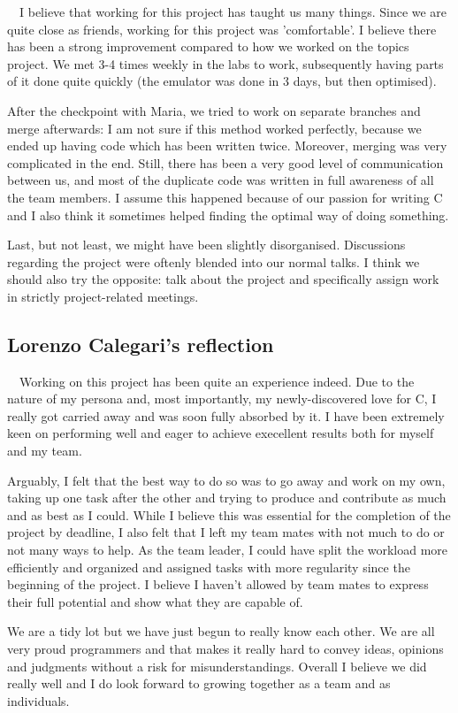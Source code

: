 \documentclass{article}
\begin{document}
\ \ I believe that working for this project has taught us many things. Since
we are quite close as friends, working for this project was 'comfortable'. I
believe there has been a strong improvement compared to how we worked on the
topics project. We met 3-4 times weekly in the labs to work, subsequently
having parts of it done quite quickly (the emulator was done in 3 days, but
then optimised).

After the checkpoint with Maria, we tried to work on separate branches and
merge afterwards: I am not sure if this method worked perfectly, because we
ended up having code which has been written twice. Moreover, merging was very
complicated in the end. Still, there has been a very good level of
communication between us, and most of the duplicate code was written in full
awareness of all the team members. I assume this happened because of our
passion for writing C and I also think it sometimes helped finding the optimal
way of doing something.

Last, but not least, we might have been slightly disorganised. Discussions
regarding the project were oftenly blended into our normal talks. I think we
should also try the opposite: talk about the project and specifically assign
work in strictly project-related meetings.

\subsection{Lorenzo Calegari's reflection}

\ \ Working on this project has been quite an experience indeed. Due to the
nature of my persona and, most importantly, my newly-discovered love for C, I
really got carried away and was soon fully absorbed by it. I have been
extremely keen on performing well and eager to achieve execellent results both
for myself and my team.

Arguably, I felt that the best way to do so was to go away and work on my own,
taking up one task after the other and trying to produce and contribute as
much and as best as I could. While I believe this was essential for the
completion of the project by deadline, I also felt that I left my team mates
with not much to do or not many ways to help. As the team leader, I could have
split the workload more efficiently and organized and assigned tasks with more
regularity since the beginning of the project. I believe I haven't allowed by
team mates to express their full potential and show what they are capable of.

We are a tidy lot but we have just begun to really know each other. We are all
very proud programmers and that makes it really hard to convey ideas, opinions
and judgments without a risk for misunderstandings. Overall I believe we did
really well and I do look forward to growing together as a team and as
individuals.
\end{document}
